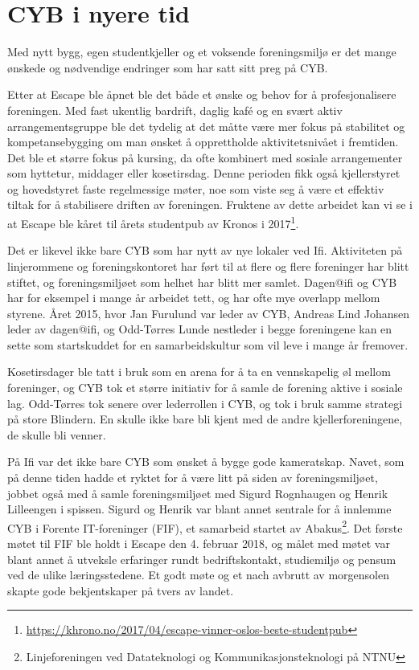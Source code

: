 \chapter{CYB i nyere tid}

\author{Skrevet av Andreas Nyborg Hansen, med hjelp fra Thor Høgås, Odd-Tørres Lunde \& Jan Furulund}

Med nytt bygg, egen studentkjeller og et voksende foreningsmiljø er det mange ønskede og nødvendige endringer som har satt sitt preg på CYB.

Etter at Escape ble åpnet ble det både et ønske og behov for å profesjonalisere foreningen. Med fast ukentlig bardrift, daglig kafé og en svært aktiv arrangementsgruppe ble det tydelig at det måtte være mer fokus på stabilitet og kompetansebygging om man ønsket å opprettholde aktivitetsnivået i fremtiden. Det ble et større fokus på kursing, da ofte kombinert med sosiale arrangementer som hyttetur, middager eller kosetirsdag. Denne perioden fikk også kjellerstyret og hovedstyret faste regelmessige møter, noe som viste seg å være et effektiv tiltak for å stabilisere driften av foreningen. Fruktene av dette arbeidet kan vi se i at Escape ble kåret til årets studentpub av Kronos i 2017\footnote{\url{https://khrono.no/2017/04/escape-vinner-oslos-beste-studentpub}}.

Det er likevel ikke bare CYB som har nytt av nye lokaler ved Ifi. Aktiviteten på linjerommene og foreningskontoret har ført til at flere og flere foreninger har blitt stiftet, og foreningsmiljøet som helhet har blitt mer samlet. Dagen@ifi og CYB har for eksempel i mange år arbeidet tett, og har ofte mye overlapp mellom styrene. Året 2015, hvor Jan Furulund var leder av CYB, Andreas Lind Johansen leder av dagen@ifi, og Odd-Tørres Lunde nestleder i begge foreningene kan en sette som startskuddet for en samarbeidskultur som vil leve i mange år fremover. 

Kosetirsdager ble tatt i bruk som en arena for å ta en vennskapelig øl mellom foreninger, og CYB tok et større initiativ for å samle de forening aktive i sosiale lag. Odd-Tørres tok senere over lederrollen i CYB, og tok i bruk samme strategi på store Blindern. En skulle ikke bare bli kjent med de andre kjellerforeningene, de skulle bli venner.  

På Ifi var det ikke bare CYB som ønsket å bygge gode kameratskap. Navet, som på denne tiden hadde et ryktet for å være litt på siden av foreningsmiljøet, jobbet også med å samle foreningsmiljøet med Sigurd Rognhaugen og Henrik Lilleengen i spissen.  Sigurd og Henrik var blant annet sentrale for å innlemme CYB i Forente IT-foreninger (FIF), et samarbeid startet av Abakus\footnote{Linjeforeningen ved Datateknologi og Kommunikasjonsteknologi på NTNU}. Det første møtet til FIF ble holdt i Escape den 4. februar 2018, og målet med møtet var blant annet å utveksle erfaringer rundt bedriftskontakt, studiemiljø og pensum ved de ulike læringsstedene. Et godt møte og et nach avbrutt av morgensolen skapte gode bekjentskaper på tvers av landet. 

